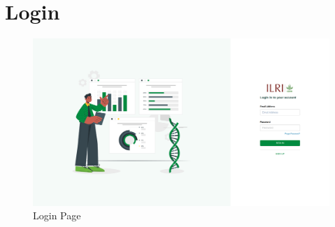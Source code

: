 \section{Login}\label{sec:login}
\begin{figure}[h!]
  	\includegraphics[width=15cm]{screenshots/login_page.png}
  	\caption{Login Page}
  	\label{fig:login_page}
\end{figure}